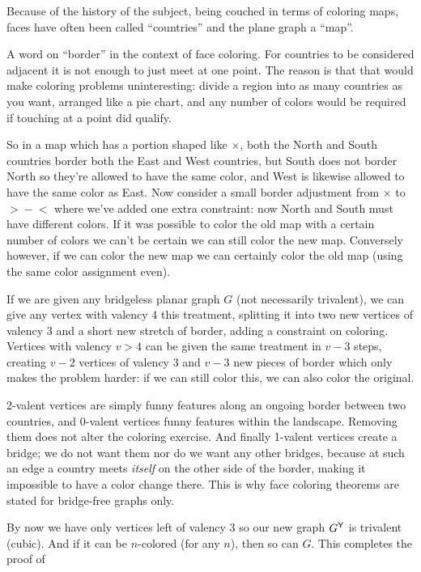 \documentclass[12pt]{article}
\let\S\scriptstyle
\begin{document}
Because of the history of the subject, being couched in terms of coloring
maps, faces have often been called ``countries'' and the plane graph a ``map''.

A word on ``border'' in the context of face coloring. For countries to be
considered adjacent it is not enough to just meet at one point. The reason is
that that would make coloring problems uninteresting: divide a region into as
many countries as you want, arranged like a pie chart, and any number of colors
would be required if touching at a point did qualify.

So in a map which has a portion shaped like $\times$, both the North and
South countries border both the East and West countries, but South does
not border North so they're allowed to have the same color, and West is
likewise allowed to have the same color as East. Now consider a small border
adjustment from $\times$ to \hbox{$\S>\!-\!<$} where we've added one
extra constraint: now North and South must have different colors. If it was
possible to color the old map with a certain number of colors we can't be
certain we can still color the new map. Conversely however, if we can color
the new map we can certainly color the old map (using the same color
assignment even).

If we are given any bridgeless planar graph $G$ (not necessarily trivalent),
we can give any vertex with valency 4 this treatment, splitting it into two
new vertices of valency 3 and a short new stretch of border, adding a
constraint on coloring. Vertices with valency $v\gt4$ can be given the same
treatment in $v-3$ steps, creating $v-2$ vertices of valency 3 and $v-3$ new
pieces of border which only makes the problem harder: if we can still color
this, we can also color the original.

2-valent vertices are simply funny features along an ongoing border
between two countries, and 0-valent vertices funny features within the
landscape. Removing them does not alter the coloring exercise. And finally
1-valent vertices create a bridge; we do not want them nor do we want any
other bridges, because at such an edge a country meets {\em itself\/} on the
other side of the border, making it impossible to have a color change there.
This is why face coloring theorems are stated for bridge-free graphs only.

By now we have only vertices left of valency 3 so our new graph $G^{\sf Y}$ is
trivalent (cubic). And if it can be $n$-colored (for any $n$), then so can $G$.
This completes the proof of
\end{document}
